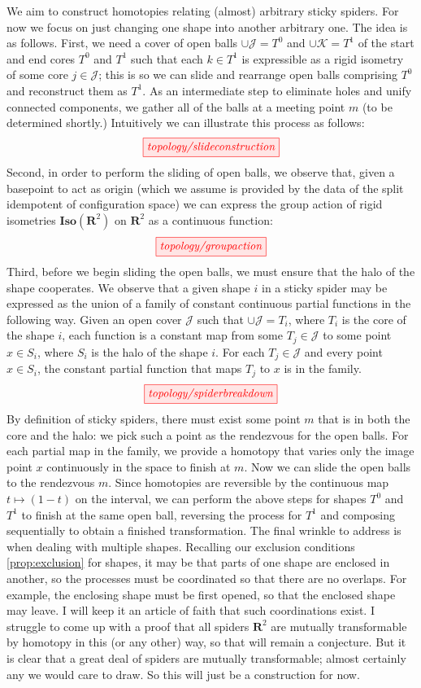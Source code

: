 \begin{fullwidth}
\begin{construction}\label{cons:morph}
We aim to construct homotopies relating (almost) arbitrary sticky spiders. For now we focus on just changing one shape into another arbitrary one. The idea is as follows. First, we need a cover of open balls $\cup\mathcal{J} = T^0$ and $\cup\mathcal{K} = T^1$ of the start and end cores $T^0$ and $T^1$ such that each $k \in T^1$ is expressible as a rigid isometry of some core $j \in \mathcal{J}$; this is so we can slide and rearrange open balls comprising $T^0$ and reconstruct them as $T^1$. As an intermediate step to eliminate holes and unify connected components, we gather all of the balls at a meeting point $m$ (to be determined shortly.) Intuitively we can illustrate this process as follows:
\[\tikzfig{topology/slideconstruction}\]
Second, in order to perform the sliding of open balls, we observe that, given a basepoint to act as origin (which we assume is provided by the data of the split idempotent of configuration space) we can express the group action of rigid isometries $\mathbf{Iso}(\mathbf{R}^2)$ on $\mathbf{R}^2$ as a continuous function:
\[\tikzfig{topology/groupaction}\]
Third, before we begin sliding the open balls, we must ensure that the halo of the shape cooperates. We observe that a given shape $i$ in a sticky spider may be expressed as the union of a family of constant continuous partial functions in the following way. Given an open cover $\mathcal{J}$ such that $\cup\mathcal{J} = T_i$, where $T_i$ is the core of the shape $i$, each function is a constant map from some $T_j \in \mathcal{J}$ to some point $x \in S_i$, where $S_i$ is the halo of the shape $i$. For each $T_j \in \mathcal{J}$ and every point $x \in S_i$, the constant partial function that maps $T_j$ to $x$ is in the family.
\[\tikzfig{topology/spiderbreakdown}\]
By definition of sticky spiders, there must exist some point $m$ that is in both the core and the halo: we pick such a point as the rendezvous for the open balls. For each partial map in the family, we provide a homotopy that varies only the image point $x$ continuously in the space to finish at $m$. Now we can slide the open balls to the rendezvous $m$. Since homotopies are reversible by the continuous map $t \mapsto (1-t)$ on the interval, we can perform the above steps for shapes $T^0$ and $T^1$ to finish at the same open ball, reversing the process for $T^1$ and composing sequentially to obtain a finished transformation. The final wrinkle to address is when dealing with multiple shapes. Recalling our exclusion conditions \ref{prop:exclusion} for shapes, it may be that parts of one shape are enclosed in another, so the processes must be coordinated so that there are no overlaps. For example, the enclosing shape must be first opened, so that the enclosed shape may leave. I will keep it an article of faith that such coordinations exist. I struggle to come up with a proof that all spiders $\mathbf{R}^2$ are mutually transformable by homotopy in this (or any other) way, so that will remain a conjecture. But it is clear that a great deal of spiders are mutually transformable; almost certainly any we would care to draw. So this will just be a construction for now.

\end{construction}
\end{fullwidth}
